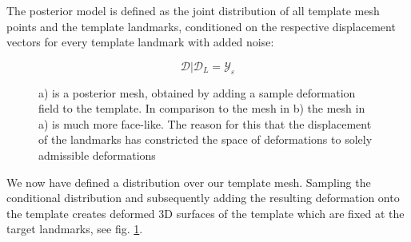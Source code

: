 The posterior model is defined as the joint distribution of all template mesh points and the
template landmarks, conditioned on the respective displacement vectors for every template landmark with added noise: 
\begin{center}
\begin{equation}
    \mathcal{D}\vert \mathcal{D}_{L} = \mathcal{Y}_{\varepsilon} 
\end{equation}
\end{center}
\begin{figure}[h!]
    \centering
    \quad\quad
    \caption{a) is a posterior mesh, obtained by adding a sample deformation field to the template. In comparison to the mesh in b) the mesh in a) is much more face-like. The reason for this that the displacement of the landmarks has constricted the space of deformations to solely admissible deformations}
\label{fig:meshposterior}
\end{figure}
We now have defined a distribution over our template mesh. Sampling the conditional distribution and subsequently adding the resulting deformation onto the template creates deformed 3D surfaces of the template which are fixed at the target landmarks, see fig. \ref{fig:meshposterior}.

